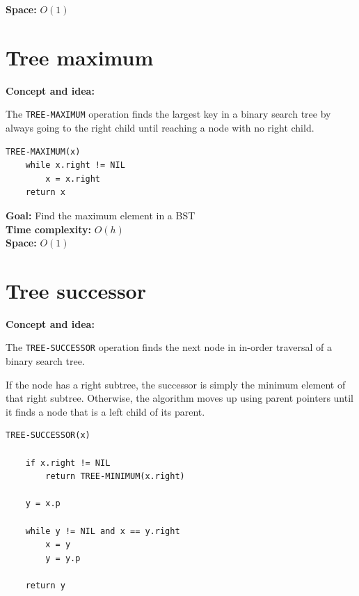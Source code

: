\documentclass[11pt,a4paper,openany]{book}
\begin{document}
\textbf{Space:} $O(1)$




\vspace{2cm}




\section{Tree maximum}

\textbf{Concept and idea:}

The \texttt{TREE-MAXIMUM} operation finds the largest key in a binary search tree by always going to the right child until reaching a node with no right child.

\begin{lstlisting}
TREE-MAXIMUM(x)
    while x.right != NIL
        x = x.right
    return x
\end{lstlisting}

\textbf{Goal:} Find the maximum element in a BST \\

\textbf{Time complexity:} $O(h)$ \\

\textbf{Space:} $O(1)$





\vspace{2cm}




\section{Tree successor}
\textbf{Concept and idea:}

The \texttt{TREE-SUCCESSOR} operation finds the next node in in-order traversal of a binary search tree.

If the node has a right subtree, the successor is simply the minimum element of that right subtree.  
Otherwise, the algorithm moves up using parent pointers until it finds a node that is a left child of its parent.

\begin{lstlisting}
TREE-SUCCESSOR(x)

    if x.right != NIL
        return TREE-MINIMUM(x.right)

    y = x.p

    while y != NIL and x == y.right
        x = y
        y = y.p

    return y
\end{lstlisting}
\end{document}
